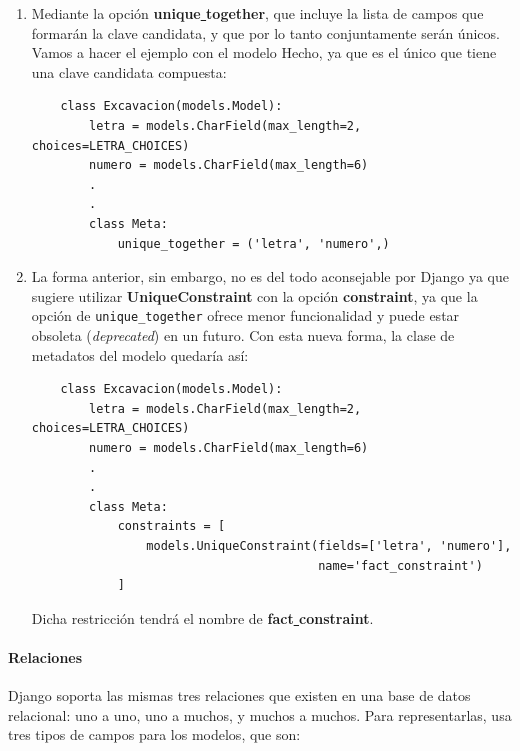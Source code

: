     \begin{enumerate}
        \item Mediante la opción \textbf{unique\underline{ }together}, que incluye la lista
        de campos que formarán la clave candidata, y que por lo tanto conjuntamente serán
        únicos. Vamos a hacer el ejemplo con el modelo Hecho, ya que es el único que tiene
        una clave candidata compuesta:
        
    
    \begin{verbatim}
    class Excavacion(models.Model):
        letra = models.CharField(max_length=2, choices=LETRA_CHOICES)
        numero = models.CharField(max_length=6)    
        .
        .
        class Meta:
            unique_together = ('letra', 'numero',)
    \end{verbatim}

        \item La forma anterior, sin embargo, no es del todo aconsejable por Django ya
        que sugiere utilizar \textbf{UniqueConstraint} con la opción \textbf{constraint},
        ya que la opción de \verb|unique_together| ofrece menor funcionalidad y puede
        estar obsoleta (\textit{deprecated}) en un futuro. Con esta nueva forma, la clase
        de metadatos del modelo quedaría así:
        
    
    \begin{verbatim}
    class Excavacion(models.Model):
        letra = models.CharField(max_length=2, choices=LETRA_CHOICES)
        numero = models.CharField(max_length=6)    
        .
        .
        class Meta:
            constraints = [
                models.UniqueConstraint(fields=['letra', 'numero'], 
                                        name='fact_constraint')                                                  
            ]
    \end{verbatim}

    Dicha restricción tendrá el nombre de \textbf{fact\underline{ }constraint}.
    \end{enumerate}

    \paragraph{Relaciones} \underline{}
    \newline Django soporta las mismas tres relaciones que existen en una base de datos relacional:
    uno a uno, uno a muchos, y muchos a muchos. Para representarlas, usa tres tipos de campos
    para los modelos, que son:

